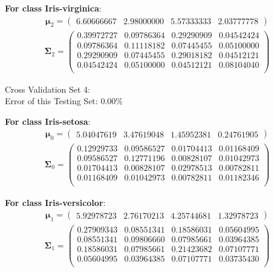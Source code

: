 \documentclass[11pt,a4paper]{article}
\newcommand{\htab}{\hspace*{0.63cm}}
\newcommand{\bs}[1]{\boldsymbol{#1}}
\begin{document}
\textbf{For class Iris-virginica}:
\begin{align} \bs{\mu}_{2} = \begin{pmatrix} 
6.60666667 & 2.98000000 & 5.57333333 & 2.03777778 
 \end{pmatrix}  \end{align} 
\vspace{-1cm}
\begin{align} \bs{\Sigma}_{2} = \begin{pmatrix} 
0.39972727 & 0.09786364 & 0.29290909 & 0.04542424 \\ 
0.09786364 & 0.11118182 & 0.07445455 & 0.05100000 \\ 
0.29290909 & 0.07445455 & 0.29018182 & 0.04512121 \\ 
0.04542424 & 0.05100000 & 0.04512121 & 0.08104040 \\ 
\end{pmatrix} \end{align}


Cross Validation Set 4: \\
\htab Error of this Testing Set: $0.00\%$ 

\textbf{For class Iris-setosa}:
\begin{align} \bs{\mu}_{0} = \begin{pmatrix} 
5.04047619 & 3.47619048 & 1.45952381 & 0.24761905 
 \end{pmatrix}  \end{align} 
\vspace{-1cm}
\begin{align} \bs{\Sigma}_{0} = \begin{pmatrix} 
0.12929733 & 0.09586527 & 0.01704413 & 0.01168409 \\ 
0.09586527 & 0.12771196 & 0.00828107 & 0.01042973 \\ 
0.01704413 & 0.00828107 & 0.02978513 & 0.00782811 \\ 
0.01168409 & 0.01042973 & 0.00782811 & 0.01182346 \\ 
\end{pmatrix} \end{align}

\textbf{For class Iris-versicolor}:
\begin{align} \bs{\mu}_{1} = \begin{pmatrix} 
5.92978723 & 2.76170213 & 4.25744681 & 1.32978723 
 \end{pmatrix}  \end{align} 
\vspace{-1cm}
\begin{align} \bs{\Sigma}_{1} = \begin{pmatrix} 
0.27909343 & 0.08551341 & 0.18586031 & 0.05604995 \\ 
0.08551341 & 0.09806660 & 0.07985661 & 0.03964385 \\ 
0.18586031 & 0.07985661 & 0.21423682 & 0.07107771 \\ 
0.05604995 & 0.03964385 & 0.07107771 & 0.03735430 \\ 
\end{pmatrix} \end{align}
\end{document}
